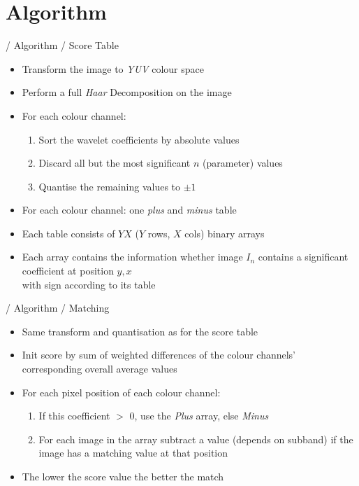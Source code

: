 \documentclass{beamer}
\begin{document}
\section{Algorithm}

\begin{frame}{/ Algorithm / Score Table}

  \begin{itemize}
  \item Transform the image to \emph{YUV} colour space
  \item Perform a full \emph{Haar} Decomposition on the image
  \item For each colour channel:
    \begin{enumerate}
    \item Sort the wavelet coefficients by absolute values
    \item Discard all but the most significant $n$ (parameter) values
    \item Quantise the remaining values to $\pm 1$
    \end{enumerate}
  \end{itemize}

  \pause
  \begin{itemize}
  \item For each colour channel: one \emph{plus} and \emph{minus}
    table
  \item Each table consists of $YX$ ($Y$ rows, $X$ cols) binary arrays 
  \item Each array contains the information whether image $I_n$ contains
    a significant coefficient at position $y, x$\\
    with sign according to its table
  \end{itemize}

\end{frame}

\begin{frame}{/ Algorithm / Matching}

  \begin{itemize}
  \item Same transform and quantisation as for the score table
  \item Init score by sum of weighted differences of the colour channels'
    corresponding overall average values
  \item For each pixel position of each colour channel:
    \begin{enumerate}
    \item If this coefficient $>$ 0, use the \emph{Plus} array,
      else \emph{Minus}
    \item For each image in the array subtract a value (depends on
      subband) if the image has a matching value at that position
    \end{enumerate}
  \item The lower the score value the better the match
  \end{itemize}

\end{frame}
\end{document}

